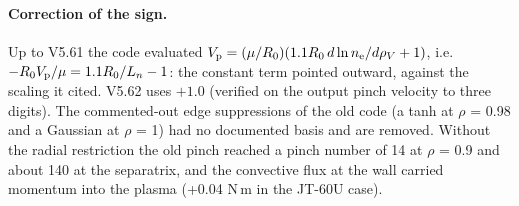 \documentclass[11pt]{article}
\def\r#1{{\rm#1}}
\begin{document}
\paragraph{Correction of the sign.}  Up to V5.61 the code evaluated
$V_\r{p} = (\mu/R_0)(1.1R_0\,d\ln n_\r{e}/d\rho_V + 1)$, i.e.\
$-R_0V_\r{p}/\mu = 1.1R_0/L_n - 1$: the constant term pointed outward, against the
scaling it cited.  V5.62 uses $+1.0$ (verified on the output pinch velocity to three
digits).  The commented-out edge suppressions of the old code (a tanh at $\rho$ = 0.98
and a Gaussian at $\rho$ = 1) had no documented basis and are removed.  Without the
radial restriction the old pinch reached a pinch number of 14 at $\rho$ = 0.9 and about
140 at the separatrix, and the convective flux at the wall carried momentum into the
plasma (+0.04 N\,m in the JT-60U case).
\end{document}
